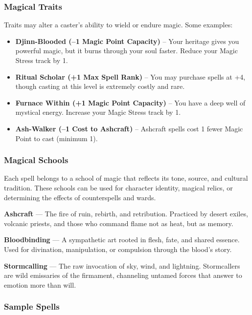\subsubsection*{Magical Traits}

Traits may alter a caster’s ability to wield or endure magic. Some examples:

\begin{itemize}\raggedright
    \item \textbf{Djinn-Blooded (–1 Magic Point Capacity)} – Your heritage gives you powerful magic, but it burns through your soul faster. Reduce your Magic Stress track by 1.
    \item \textbf{Ritual Scholar (+1 Max Spell Rank)} – You may purchase spells at +4, though casting at this level is extremely costly and rare.
    \item \textbf{Furnace Within (+1 Magic Point Capacity)} – You have a deep well of mystical energy. Increase your Magic Stress track by 1.
    \item \textbf{Ash-Walker (–1 Cost to Ashcraft)} – Ashcraft spells cost 1 fewer Magic Point to cast (minimum 1).
\end{itemize}

\subsubsection*{Magical Schools}

Each spell belongs to a school of magic that reflects its tone, source, and cultural tradition. These schools can be used for character identity, magical relics, or determining the effects of counterspells and wards.

\vspace{0.5\baselineskip}
\textbf{Ashcraft} — The fire of ruin, rebirth, and retribution. Practiced by desert exiles, volcanic priests, and those who command flame not as heat, but as memory.

\textbf{Bloodbinding} — A sympathetic art rooted in flesh, fate, and shared essence. Used for divination, manipulation, or compulsion through the blood’s story.

\textbf{Stormcalling} — The raw invocation of sky, wind, and lightning. Stormcallers are wild emissaries of the firmament, channeling untamed forces that answer to emotion more than will.

\subsubsection*{Sample Spells}


